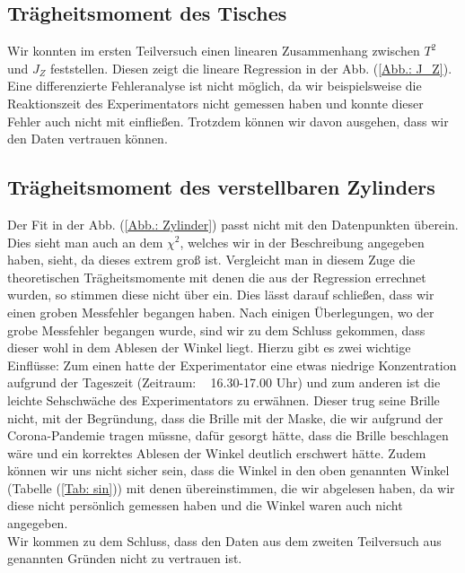 \documentclass[bibliography=totocnumbered]{scrartcl}
\begin{document}
	\subsection{Trägheitsmoment des Tisches}
	Wir konnten im ersten Teilversuch einen linearen Zusammenhang zwischen $ T^{2} $ und $ J_{Z} $ feststellen. Diesen zeigt die lineare Regression in der Abb. (\ref{Abb.: J_Z}). Eine differenzierte Fehleranalyse ist nicht möglich, da wir beispielsweise die Reaktionszeit des Experimentators nicht gemessen haben und konnte dieser Fehler auch nicht mit einfließen. Trotzdem können wir davon ausgehen, dass wir den Daten vertrauen können.
	
	\subsection{Trägheitsmoment des verstellbaren Zylinders}
	Der Fit in der Abb. (\ref{Abb.: Zylinder}) passt nicht mit den Datenpunkten überein. Dies sieht man auch an dem $ \chi^{2} $, welches wir in der Beschreibung angegeben haben, sieht, da dieses extrem groß ist. Vergleicht man in diesem Zuge die theoretischen Trägheitsmomente mit denen die aus der Regression errechnet wurden, so stimmen diese nicht über ein. Dies lässt darauf schließen, dass wir einen groben Messfehler begangen haben. Nach einigen Überlegungen, wo der grobe Messfehler begangen wurde, sind wir zu dem Schluss gekommen, dass dieser wohl in dem Ablesen der Winkel liegt. Hierzu gibt es zwei wichtige Einflüsse: Zum einen hatte der Experimentator eine etwas niedrige Konzentration aufgrund der Tageszeit (Zeitraum: ~ 16.30-17.00 Uhr) und zum anderen ist die leichte Sehschwäche des Experimentators zu erwähnen. Dieser trug seine Brille nicht, mit der Begründung, dass die Brille mit der Maske, die wir aufgrund der Corona-Pandemie tragen müssne, dafür gesorgt hätte, dass die Brille beschlagen wäre und ein korrektes Ablesen der Winkel deutlich erschwert hätte. Zudem können wir uns nicht sicher sein, dass die Winkel in den oben genannten Winkel (Tabelle (\ref{Tab: sin})) mit denen übereinstimmen, die wir abgelesen haben, da wir diese nicht persönlich gemessen haben und die Winkel waren auch nicht angegeben. \\
	Wir kommen zu dem Schluss, dass den Daten aus dem zweiten Teilversuch aus genannten Gründen nicht zu vertrauen ist.
	
	\newpage
    \appendix
	
	\newpage
	
	\printbibliography[title={Quellenverzeichnis}]
	
	
\end{document}
